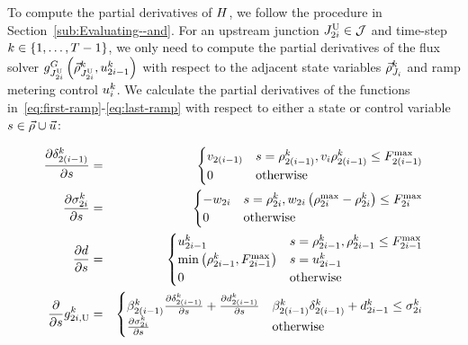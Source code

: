 To compute the partial derivatives of $H$, we follow the procedure
in Section~\ref{sub:Evaluating--and}. For an upstream junction
$J_{2i}^{\text{U}}\in\mathcal{J}$ and time-step $k\in\left\{ 1,\ldots,T-1\right\}$,
we only need to compute the partial derivatives of the flux solver
$g^{G}_{J_{2i}^{\text{U}}}\left(\vec{\rho}_{J_{2i}^{\text{U}}}^{k},u_{2i-1}^{k}\right)_{\text{}}$
with respect to the adjacent state variables $\vec{\rho}_{J_{i}}^{k}$
and ramp metering control $u_{i}^{k}$. We calculate the
partial derivatives of the functions in~\eqref{eq:first-ramp}-\eqref{eq:last-ramp}
with respect to either a state or control variable$s\in\vec{\rho}\cup\vec{u}$:

\begin{eqnarray*}
\pfrac{\demand_{2\left(\link-1\right)}^{\tind}}s & = & \begin{cases}
\ffspeed_{2\left(i-1\right)} & s=\densitydiscrete{2\left(\link-1\right)}{\tind},\ffspeed_{i}\densitydiscrete{2\left(\link-1\right)}{\tind}\le F_{2\left(i-1\right)}^{\max}\\
0 & \text{otherwise}
\end{cases}\\
\pfrac{\supply_{2\link}^{\tind}}s & = & \begin{cases}
-\congspeed_{2i} & s=\densitydiscrete{2\link}{\tind},\congspeed_{2i}\left(\density_{2i}^{\max}-\densitydiscrete{2\link}{\tind}\right)\le F_{2i}^{\max}\\
0 & \text{otherwise}
\end{cases}\\
\pfrac ds & = & \begin{cases}
\ramp_{2\link-1}^{\tind} & s=\densitydiscrete{2\link-1}{\tind},\densitydiscrete{2\link-1}{\tind}\le F_{2\link-1}^{\max}\\
\min\left(\densitydiscrete{2\link-1}{\tind},F_{2i-1}^{\max}\right) & s=\ramp_{2\link-1}^{\tind}\\
0 & \text{otherwise}
\end{cases}\\
\pfrac{}s\fin{2\link}{\tind} & = & \begin{cases}
\splitratio_{2\left(\link-1\right)}^{\tind}\pfrac{\demand_{2\left(\link-1\right)}^{\tind}}s+\pfrac{\rampDemand_{2\left(\link-1\right)}^{\tind}}s & \splitratio_{2\left(\link-1\right)}^{\tind}\demand_{2\left(\link-1\right)}^{\tind}+\rampDemand_{2\link-1}^{\tind}\le\supply_{2\link}^{\tind}\\
\pfrac{\supply_{2\link}^{\tind}}s & \text{otherwise}
\end{cases}\\

\end{eqnarray*}
